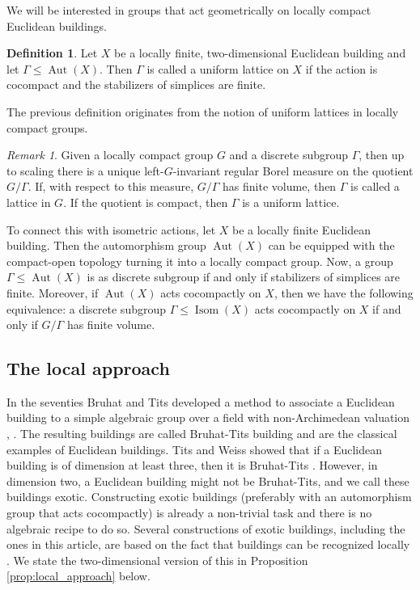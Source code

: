 \documentclass[dvipsnames]{article}
\theoremstyle{definition}
\newtheorem{definition}[theorem]{Definition}
\theoremstyle{remark}
\newtheorem{remark}[theorem]{Remark}
\DeclareMathOperator{\Aut}{Aut}
\DeclareMathOperator{\Isom}{Isom}
\begin{document}
    We will be interested in groups that act geometrically on locally compact Euclidean buildings.

    \begin{definition}
        Let $X$ be a locally finite, two-dimensional Euclidean building and let $\Gamma \leq \Aut(X)$. Then $\Gamma$ is called a uniform lattice on $X$ if the action is cocompact and the stabilizers of simplices are finite.
    \end{definition}

    The previous definition originates from the notion of uniform lattices in locally compact groups.
        
    \begin{remark} 
        Given a locally compact group $G$ and a discrete subgroup $\Gamma$, then up to scaling there is a unique left-$G$-invariant regular Borel measure on the quotient $G/\Gamma$. If, with respect to this measure, $G/\Gamma$ has finite volume, then $\Gamma$ is called a lattice in $G$. If the quotient is compact, then $\Gamma$ is a uniform lattice.

        To connect this with isometric actions, let $X$ be a locally finite Euclidean building.
        Then the automorphism group $\Aut(X)$ can be equipped with the compact-open topology turning it into a locally compact group.
        Now, a group $\Gamma \leq \Aut(X)$ is as discrete subgroup if and only if stabilizers of simplices are finite.
        Moreover, if $\Aut(X)$ acts cocompactly on $X$, then we have the following equivalence: a discrete subgroup $\Gamma \leq \Isom(X)$ acts cocompactly on $X$ if and only if $G/\Gamma$ has finite volume.
    \end{remark}

    \subsection{The local approach}

    In the seventies Bruhat and Tits developed a method to associate a Euclidean building to a simple algebraic group over a field with non-Archimedean valuation \cite{BruhatTits1}, \cite{BruhatTits2}. The resulting buildings are called Bruhat-Tits building and are the classical examples of Euclidean buildings.
    Tits and Weiss showed that if a Euclidean building is of dimension at least three, then it is Bruhat-Tits \cite{Tits_classification, Weiss}.
    However, in dimension two, a Euclidean building might not be Bruhat-Tits, and we call these buildings exotic.
    Constructing exotic buildings (preferably with an automorphism group that acts cocompactly) is already a non-trivial task and there is no algebraic recipe to do so. 
    Several constructions of exotic buildings, including the ones in this article, are based on the fact that buildings can be recognized locally \cite{Tits}. We state the two-dimensional version of this in Proposition \ref{prop:local_approach} below.
\end{document}
